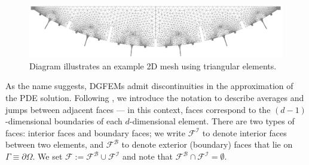     
        \begin{figure}
            \begin{centering}
                \includegraphics[width=\textwidth]{diagrams/meshes/inverted-circle-slice-6-flat_normal-walls.png}
                \caption{Diagram illustrates an example 2D mesh using triangular elements.}
                \label{fig:mesh-discretisation}
            \end{centering}
        \end{figure}

        As the name suggests, DGFEMs admit discontinuities in the approximation of the PDE solution. Following \cite{cangianiHpVersionDiscontinuousGalerkin2017}, we introduce the notation to describe averages and jumps between adjacent faces --- in this context, faces correspond to the $(d-1)$-dimensional boundaries of each $d$-dimensional element. There are two types of faces: interior faces and boundary faces; we write $\mathcal{F}^\mathcal{I}$ to denote interior faces between two elements, and $\mathcal{F}^\mathcal{B}$ to denote exterior (boundary) faces that lie on $\Gamma \equiv \partial \Omega$. We set $\mathcal{F} := \mathcal{F}^\mathcal{B} \cup \mathcal{F}^\mathcal{I}$ and note that $\mathcal{F}^\mathcal{B} \cap \mathcal{F}^\mathcal{I} = \emptyset$.

